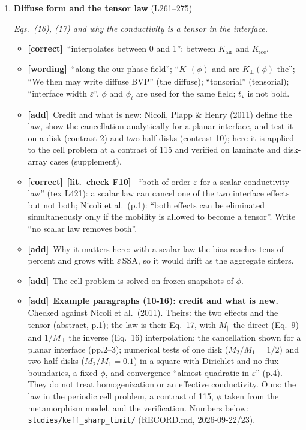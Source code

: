 \documentclass[11pt]{article}
\newcommand{\Pg}[3]{\item \textbf{#1} {\small(#2)}\par\textit{#3}}
\newcommand{\tC}{\textcolor{miss}{\textbf{[correct]}}\ }
\newcommand{\tG}{\textcolor{stale}{\textbf{[wording]}}\ }
\newcommand{\tA}{\textcolor{have}{\textbf{[add]}}\ }
\newcommand{\Chk}[1]{\textcolor{chk}{\textbf{[lit.\ check #1]}}\ }
\begin{document}
\begin{enumerate}
\Pg{Diffuse form and the tensor law}{L261--275}{Eqs.~(16), (17) and why the conductivity is a tensor in the interface.}
  \begin{itemize}
  \item \tC ``interpolates between 0 and 1'': between $K_{\mathrm{air}}$ and
    $K_{\mathrm{ice}}$.
  \item \tG ``along the our phase-field''; ``$K_\parallel(\phi)$ and are
    $K_\perp(\phi)$ the''; ``We then may write diffuse BVP'' (the diffuse);
    ``tonsorial'' (tensorial); ``interface width $\varepsilon$''. $\phi$
    and $\phi_i$ are used for the same field; $t_\star$ is not bold.
  \item \tA Credit and what is new: Nicoli, Plapp \& Henry (2011) define the
    law, show the cancellation analytically for a planar interface, and test
    it on a disk (contrast 2) and two half-disks (contrast 10); here it is applied to the cell problem at a contrast of 115
    and verified on laminate and disk-array cases (supplement).
  \item \tC \Chk{F10} ``both of order $\varepsilon$ for a scalar conductivity
    law'' (tex L421): a scalar law can cancel one of the two interface
    effects but not both; Nicoli et al.\ (p.1): ``both effects can be
    eliminated simultaneously only if the mobility is allowed to become a
    tensor''. Write ``no scalar law removes both''.
  \item \tA Why it matters here: with a scalar law the bias reaches tens of
    percent and grows with $\varepsilon\,$SSA, so it would drift as the
    aggregate sinters.
  \item \tA The cell problem is solved on frozen snapshots of $\phi$.
  \item \tA \textbf{Example paragraphs (10-16): credit and what is new.}
    Checked against Nicoli et al.\ (2011). Theirs: the two effects and the
    tensor (abstract, p.1); the law is their Eq.~17, with $M_\parallel$ the
    direct (Eq.~9) and $1/M_\perp$ the inverse (Eq.~16) interpolation; the
    cancellation shown for a planar interface (pp.2--3); numerical tests of
    one disk ($M_2/M_1 = 1/2$) and two half-disks ($M_2/M_1 = 0.1$) in a
    square with Dirichlet and no-flux boundaries, a fixed $\phi$, and
    convergence ``almost quadratic in $\varepsilon$'' (p.4). They do not
    treat homogenization or an effective conductivity. Ours: the law in the
    periodic cell problem, a contrast of 115, $\phi$ taken from the
    metamorphism model, and the verification. Numbers below:
    \texttt{studies/keff\_sharp\_limit/} (RECORD.md, 2026-09-22/23).

\end{itemize}
\end{enumerate}
\end{document}
